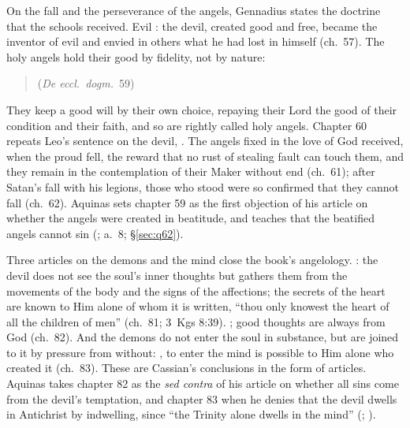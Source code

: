 On the fall and the perseverance of the angels, Gennadius states the
doctrine that the schools received. Evil : the devil,
created good and free, became the inventor of evil and envied in others
what he had lost in himself (ch.~57). The holy angels hold their good by fidelity, not by
nature:
\begin{quote}
 (\emph{De eccl.\ dogm.}\ 59)
\end{quote}
\noindent They keep a good will by their own choice, repaying their Lord
the good of their condition and their faith, and so are rightly called
holy angels. Chapter 60 repeats Leo's sentence
on the devil, .
The angels fixed in the love of God received, when the proud fell, the
reward that no rust of stealing fault can touch them, and they remain in
the contemplation of their Maker without end (ch.~61); after Satan's fall
with his legions, those who stood were so confirmed that they cannot fall
(ch.~62). Aquinas sets chapter 59 as the first objection of his article on
whether the angels were created in beatitude, and teaches that the
beatified angels cannot sin (; a.~8;
\S\ref{sec:q62}).

Three articles on the demons and the mind close the book's angelology.
: the devil does not see the soul's inner thoughts but gathers
them from the movements of the body and the signs of the affections; the
secrets of the heart are known to Him alone of whom it is written, ``thou only
knowest the heart of all the children of men'' (ch.~81; 3~Kgs 8:39).
; good
thoughts are always from God (ch.~82). And
the demons do not enter the soul in substance, but are joined to it by
pressure from without: , to enter the mind is possible to Him alone who created it
(ch.~83). These are Cassian's conclusions in the form of articles.
Aquinas takes chapter 82 as the \emph{sed contra} of his article on
whether all sins come from the devil's temptation, and chapter 83 when he
denies that the devil dwells in Antichrist by indwelling, since ``the
Trinity alone dwells in the mind'' (; ).

